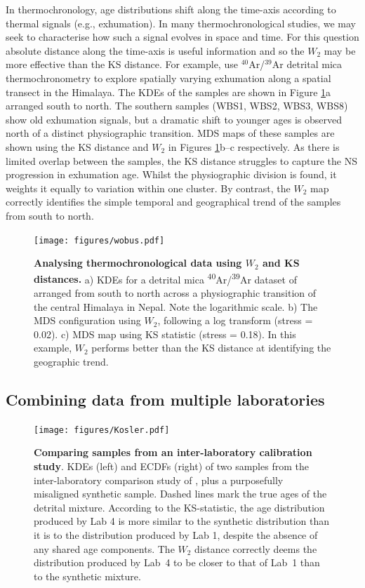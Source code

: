 \documentclass[gchron, manuscript]{copernicus}
\begin{document}
In thermochronology, age distributions shift along the time-axis according to thermal signals (e.g., exhumation). In many thermochronological studies, we may seek to characterise how such a signal evolves in space and time. For this question absolute distance along the time-axis is useful information and so the $W_2$ may be more effective than the KS distance. For example, \citet{wobus_has_2003} use $^{40}$Ar/$^{39}$Ar detrital mica thermochronometry to explore spatially varying exhumation along a spatial transect in the Himalaya. The KDEs of the samples are shown in Figure \ref{fig:Wobus}a arranged south to north. The southern samples (WBS1, WBS2, WBS3, WBS8) show old exhumation signals, but a dramatic shift to younger ages is observed north of a distinct physiographic transition. MDS maps of these samples are shown using the KS distance and $W_2$ in Figures \ref{fig:Wobus}b--c respectively. As there is limited overlap between the samples, the KS distance struggles to capture the NS progression in exhumation age. Whilst the physiographic division is found, it weights it equally to variation within one cluster. By contrast, the $W_2$ map correctly identifies the simple temporal and geographical trend of the samples from south to north. 

\begin{figure}
    \centering
    \texttt{[image: figures/wobus.pdf]}
    \caption{\textbf{Analysing thermochronological data using $W_2$ and KS distances.} a) KDEs for a detrital mica \textsuperscript{40}Ar/\textsuperscript{39}Ar dataset of \citet{wobus_has_2003} arranged from south to north across a physiographic transition of the central Himalaya in Nepal. Note the logarithmic scale. b) The MDS configuration using $W_2$, following a log transform (stress = 0.02). c) MDS map using KS statistic (stress = 0.18). In this example, $W_2$ performs better than the KS distance at identifying the geographic trend.}
    \label{fig:Wobus}
\end{figure}

\subsection{Combining data from multiple laboratories}

\begin{figure}
    \centering
    \texttt{[image: figures/Kosler.pdf]}
    \caption{\textbf{Comparing samples from an inter-laboratory calibration study}. KDEs (left) and ECDFs (right) of two samples from the inter-laboratory comparison study of \citep{kosler_u-pb_2013}, plus a purposefully misaligned synthetic sample. Dashed lines mark the true ages of the detrital mixture. According to the KS-statistic, the age distribution produced by Lab 4 is more similar to the synthetic distribution than it is to the distribution produced by Lab 1, despite the absence of any shared age components. The $W_2$ distance correctly deems the distribution produced by Lab~4 to be closer to that of Lab~1 than to the synthetic mixture.}
    \label{fig:interlab}
\end{figure}
\end{document}
